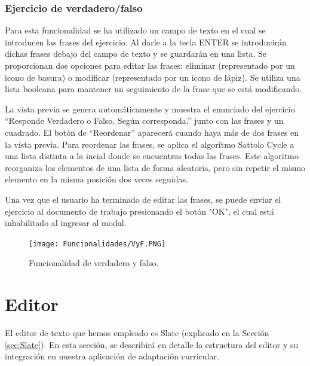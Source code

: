 \subsubsection{Ejercicio de verdadero/falso}
Para esta funcionalidad se ha utilizado un campo de texto en el cual se introducen las frases del ejercicio. Al darle a la tecla ENTER se introducirán dichas frases debajo del campo de texto y se guardarán en una lista. Se proporcionan dos opciones para editar las frases: eliminar (representado por un icono de basura) o modificar (representado por un icono de lápiz). Se utiliza una lista booleana para mantener un seguimiento de la frase que se está modificando.

La vista previa se genera automáticamente y muestra el enunciado del ejercicio ``Responde Verdadero o Falso. Según corresponda.'' junto con las frases y un cuadrado. El botón de ``Reordenar'' aparecerá cuando haya más de dos frases en la vista previa. Para reordenar las frases, se aplica el algoritmo Sattolo Cycle a una lista distinta a la incial donde se encuentras todas las frases. Este algoritmo reorganiza los elementos de una lista de forma aleatoria, pero sin repetir el mismo elemento en la misma posición dos veces seguidas.

Una vez que el usuario ha terminado de editar las frases, se puede enviar el ejercicio al documento de trabajo presionando el botón "OK", el cual está inhabilitado al ingresar al modal.

\begin{figure}[ht!]
  \centering
  \texttt{[image: Funcionalidades/VyF.PNG]}
  \caption{Funcionalidad de verdadero y falso.}
  \label{fig:vyf}
\end{figure}

\section{Editor}
\label{Editor}
El editor de texto que hemos empleado es Slate (explicado en la Sección \ref{sec:Slate}). En esta sección, se describirá en detalle la estructura del editor y su integración en nuestra aplicación de adaptación curricular.

